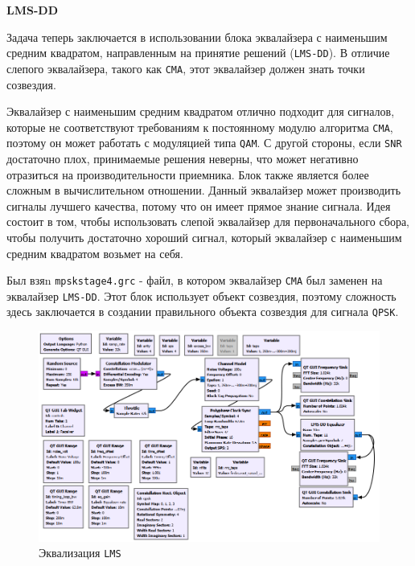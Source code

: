 \documentclass[a4paper]{article}
\begin{document}
            \normalsize{\LARGE \textbf{LMS-DD}}
            
            Задача теперь заключается в использовании блока эквалайзера с наименьшим средним квадратом, направленным на принятие решений (\texttt{LMS-DD}). В отличие слепого эквалайзера, такого как \texttt{CMA}, этот эквалайзер должен знать точки созвездия.
            
            Эквалайзер с наименьшим средним квадратом отлично подходит для сигналов, которые не соответствуют требованиям к постоянному модулю алгоритма \texttt{CMA}, поэтому он может работать с модуляцией типа \texttt{QAM}. С другой стороны, если \texttt{SNR} достаточно плох, принимаемые решения неверны, что может негативно отразиться на производительности приемника. Блок также является более сложным в вычислительном отношении. Данный эквалайзер может производить сигналы лучшего качества, потому что он имеет прямое знание сигнала. Идея состоит в том, чтобы использовать слепой эквалайзер для первоначального сбора, чтобы получить достаточно хороший сигнал, который эквалайзер с наименьшим средним квадратом возьмет на себя.
            
            Был взяn \texttt{mpskstage4.grc} - файл, в котором эквалайзер \texttt{CMA} был заменен на эквалайзер \texttt{LMS-DD}. Этот блок использует объект созвездия, поэтому сложность здесь заключается в создании правильного объекта созвездия для сигнала \texttt{QPSK}.
            
            \begin{figure}[H]
                \centering
                \includegraphics[width=\textwidth]{img/p6_3.png}
                \caption{Эквализация \texttt{LMS}}
                \label{fig:p6_3}
            \end{figure}
            
\end{document}
